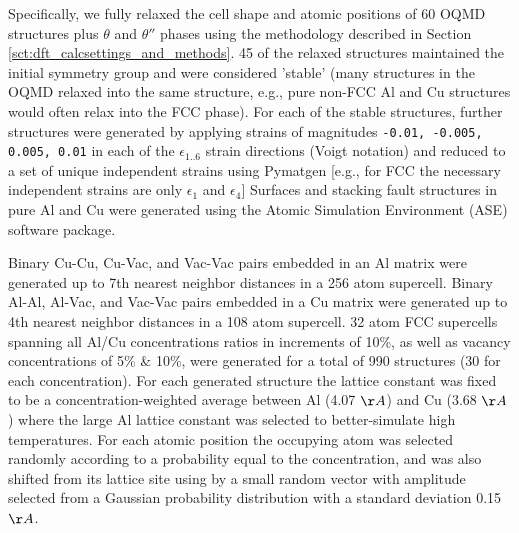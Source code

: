 \documentclass{article}
\begin{document}
Specifically, we fully relaxed the cell shape and atomic positions of 60 OQMD structures plus $\theta$ and $\theta''$ phases using the methodology described in Section \ref{sct:dft_calcsettings_and_methods}.  45 of the relaxed structures maintained the initial symmetry group and were considered 'stable' (many structures in the OQMD relaxed into the same structure, e.g., pure non-FCC Al and Cu structures would often relax into the FCC phase).
For each of the stable structures, further structures were generated by applying strains of magnitudes \texttt{-0.01, -0.005, 0.005, 0.01} in each of the $\epsilon_{1..6}$ strain directions (Voigt notation) and reduced to a set of unique independent strains using Pymatgen\cite{Ong2013} [e.g., for FCC the necessary independent strains are only $\epsilon_1$ and $\epsilon_4$]
Surfaces and stacking fault structures in pure Al and Cu were generated using the Atomic Simulation Environment (ASE) software package.

Binary Cu-Cu, Cu-Vac, and Vac-Vac pairs embedded in an Al matrix were generated up to 7th nearest neighbor distances in a 256 atom supercell. 
Binary Al-Al, Al-Vac, and Vac-Vac pairs embedded in a Cu matrix were generated up to 4th nearest neighbor distances in a 108 atom supercell. 
32 atom FCC supercells spanning all Al/Cu concentrations ratios in increments of 10\%, as well as vacancy concentrations of 5\% \& 10\%, were generated for a total of 990 structures (30 for each concentration).
For each generated structure the lattice constant was fixed to be a concentration-weighted average between Al (4.07 $\AA$) and Cu (3.68 $\AA$) where the large Al lattice constant was selected to better-simulate high temperatures. For each atomic position the occupying atom was selected randomly according to a probability equal to the concentration, and was also shifted from its lattice site using by a small random vector with amplitude selected from a Gaussian probability distribution with a standard deviation 0.15$\AA$.
\end{document}
